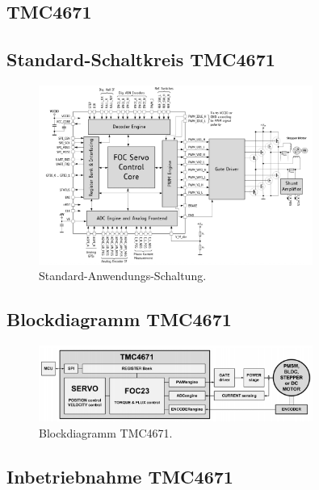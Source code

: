 \begin{appendix} 
\newpage
\section{TMC4671}\label{Appendix:TMC4671}

\subsection{Standard-Schaltkreis TMC4671}

\begin{figure}[h!]
	\centering
	\includegraphics[width=0.8\textwidth]{graphics/Standard_Application_Cirquit_TMC4671}
	\caption{Standard-Anwendungs-Schaltung.}
	\label{fig:Schaltung_TMC4671}
\end{figure}

\subsection{Blockdiagramm TMC4671}

\begin{figure}[h!]
	\centering
	\includegraphics[width=0.8\textwidth]{graphics/Blockdiagramm_TMC4671}
	\caption{Blockdiagramm TMC4671.}
	\label{fig:Blockdiagramm_TMC4671}
\end{figure}


\newpage

\subsection{Inbetriebnahme TMC4671}


\end{appendix}
